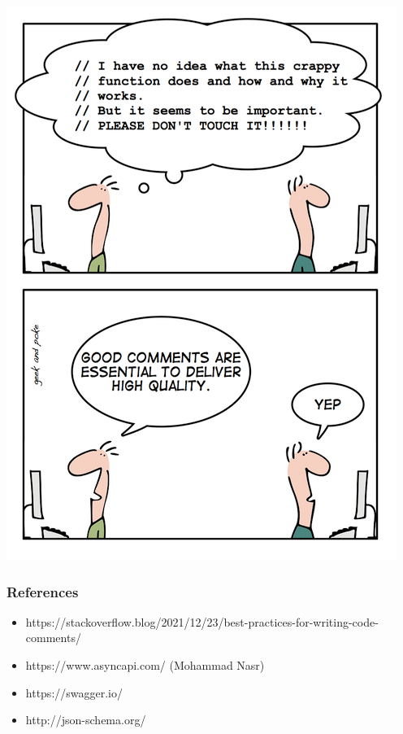 \documentclass{efd-lecture}
\begin{document}
\begin{frame}
  \begin{center}
  \includegraphics[height=\textheight]{./img/cartoon-2.png}
  \end{center}
\end{frame}

\begin{frame}
  \frametitle{References}
  \begin{itemize}
    \item https://stackoverflow.blog/2021/12/23/best-practices-for-writing-code-comments/
    \item https://www.asyncapi.com/ (Mohammad Nasr)
    \item https://swagger.io/
    \item http://json-schema.org/
  \end{itemize}
\end{frame}
\end{document}
